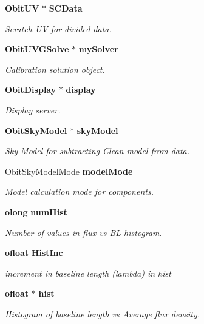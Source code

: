 \begin{CompactItemize}
{\bf Obit\-UV} $\ast$ {\bf SCData}
\begin{CompactList}\small\item\em Scratch UV for divided data. \item\end{CompactList}\item 
{\bf Obit\-UVGSolve} $\ast$ {\bf my\-Solver}
\begin{CompactList}\small\item\em Calibration solution object. \item\end{CompactList}\item 
{\bf Obit\-Display} $\ast$ {\bf display}
\begin{CompactList}\small\item\em Display server. \item\end{CompactList}\item 
{\bf Obit\-Sky\-Model} $\ast$ {\bf sky\-Model}
\begin{CompactList}\small\item\em Sky Model for subtracting Clean model from data. \item\end{CompactList}\item 
Obit\-Sky\-Model\-Mode {\bf model\-Mode}
\begin{CompactList}\small\item\em Model calculation mode for components. \item\end{CompactList}\item 
{\bf olong} {\bf num\-Hist}
\begin{CompactList}\small\item\em Number of values in flux vs BL histogram. \item\end{CompactList}\item 
{\bf ofloat} {\bf Hist\-Inc}
\begin{CompactList}\small\item\em increment in baseline length (lambda) in hist \item\end{CompactList}\item 
{\bf ofloat} $\ast$ {\bf hist}
\begin{CompactList}\small\item\em Histogram of baseline length vs Average flux density. \item\end{CompactList}\item 

\end{CompactItemize}
